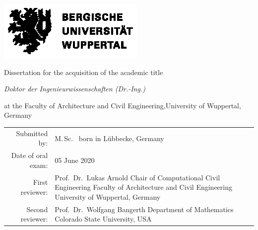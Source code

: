 \begin{titlingpage}
  \begin{center}
    \vspace*{5mm}
    \includegraphics[width=.75\textwidth]{logos/BUW_Logo-schwarz.eps}
    \vspace*{\fill}\par
    {\Huge \thetitle\par}
    \vspace*{\fill}\par
    {\LARGE Dissertation for the acquisition of the academic title\par}
    \medskip
    {\LARGE \itshape Doktor der Ingenieurwissenschaften (Dr.-Ing.)\par}
    \medskip
    {\LARGE at the Faculty of Architecture and Civil Engineering,\linebreak University of Wuppertal, Germany\par}
    \vspace*{\fill}
    \begin{tabular}{rp{7cm}}
      \Large Submitted by: &
        \Large M.\,Sc.\ \theauthor{} \newline
        \normalsize born in Lübbecke, Germany \bigskip \\
      \Large Date of oral exam: &
        \Large 05 June 2020 \bigskip \\
      \Large First reviewer: &
        \Large Prof.\ Dr.\ Lukas Arnold \newline
        \normalsize Chair of Computational Civil Engineering \newline
        Faculty of Architecture and Civil Engineering \newline
        University of Wuppertal, Germany \bigskip \\
      \Large Second reviewer: &
        \Large Prof.\ Dr.\ Wolfgang Bangerth \newline
        \normalsize Department of Mathematics \newline
        Colorado State University, USA \\
    \end{tabular}
  \end{center}
\end{titlingpage}